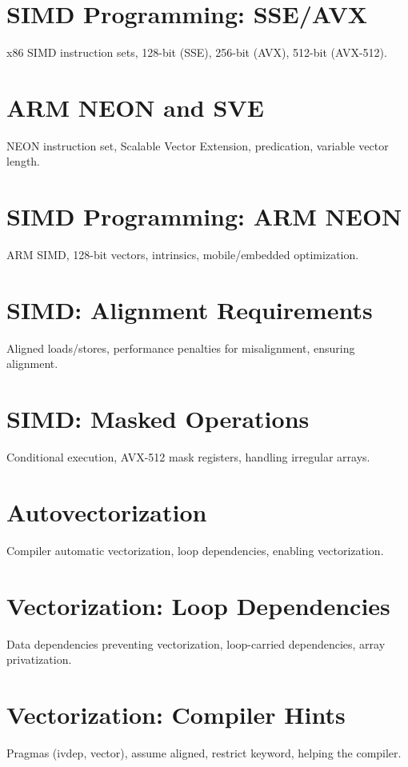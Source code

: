 \chapter{SIMD Programming: SSE/AVX}
x86 SIMD instruction sets, 128-bit (SSE), 256-bit (AVX), 512-bit (AVX-512).

\chapter{ARM NEON and SVE}
NEON instruction set, Scalable Vector Extension, predication, variable vector length.

\chapter{SIMD Programming: ARM NEON}
ARM SIMD, 128-bit vectors, intrinsics, mobile/embedded optimization.

\chapter{SIMD: Alignment Requirements}
Aligned loads/stores, performance penalties for misalignment, ensuring alignment.

\chapter{SIMD: Masked Operations}
Conditional execution, AVX-512 mask registers, handling irregular arrays.

\chapter{Autovectorization}
Compiler automatic vectorization, loop dependencies, enabling vectorization.

\chapter{Vectorization: Loop Dependencies}
Data dependencies preventing vectorization, loop-carried dependencies, array privatization.

\chapter{Vectorization: Compiler Hints}
Pragmas (ivdep, vector), assume aligned, restrict keyword, helping the compiler.



